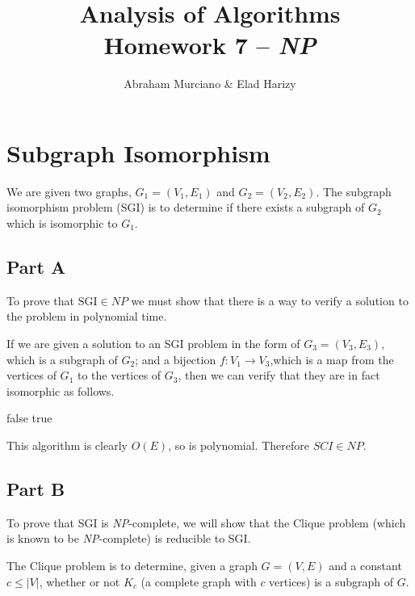 \documentclass{article}
\title{Analysis of Algorithms \\
\medskip
\large Homework 7 -- \textit{NP}}
\author{Abraham Murciano \& Elad Harizy}
\begin{document}
\maketitle

\section{Subgraph Isomorphism}

We are given two graphs, \(G_1 = (V_1, E_1)\) and \(G_2 = (V_2, E_2)\). The subgraph isomorphism problem (SGI) is to determine if there exists a subgraph of \(G_2\) which is isomorphic to \(G_1\).

\subsection*{Part A}

To prove that \(\text{SGI} \in \mathit{NP}\) we must show that there is a way to verify a solution to the problem in polynomial time.

If we are given a solution to an SGI problem in the form of \(G_3 = (V_3, E_3)\), which is a subgraph of \(G_2\); and a bijection \(f : V_1 \to V_3\),which is a map from the vertices of \(G_1\) to the vertices of \(G_3\), then we can verify that they are in fact isomorphic as follows.

\begin{algorithm}
	\begin{algorithmic}
		\Return false
		\EndIf
		\EndFor
		\State \Return true
		\EndFunction
	\end{algorithmic}
\end{algorithm}

This algorithm is clearly \(O(E)\), so is polynomial. Therefore \(\mathit{SCI} \in \mathit{NP}\).

\subsection*{Part B}

To prove that SGI is \textit{NP}-complete, we will show that the Clique problem (which is known to be \textit{NP}-complete) is reducible to SGI.

The Clique problem is to determine, given a graph \(G = (V, E)\) and a constant \(c \leq |V|\), whether or not \(K_c\) (a complete graph with \(c\) vertices) is a subgraph of \(G\).
\end{document}
